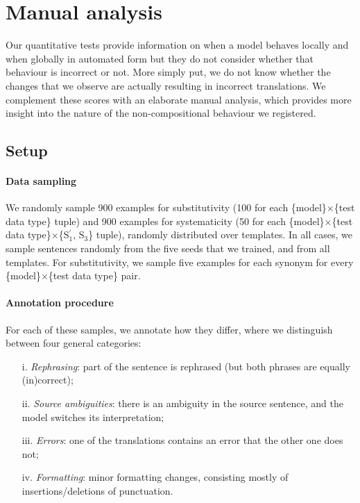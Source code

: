 \onecolumn
\section{Manual analysis}\label{app:man_analysis}

Our quantitative tests provide information on when a model behaves locally and when globally in automated form but they do not consider whether that behaviour is incorrect or not.
More simply put, we do not know whether the changes that we observe are actually resulting in incorrect translations.
We complement these scores with an elaborate manual analysis, which provides more insight into the nature of the non-compositional behaviour we registered.

\subsection{Setup}

\paragraph{Data sampling} We randomly sample 900 examples for substitutivity (100 for each \{model\}$\times$\{test data type\} tuple) and 900 examples for systematicity (50 for each \{model\}$\times$\{test data type\}$\times$\{S$_1^\prime$, S$_3$\} tuple), randomly distributed over templates.
In all cases, we sample sentences randomly from the five seeds that we trained, and from all templates.
For substitutivity, we sample five examples for each synonym for every \{model\}$\times$\{test data type\} pair.

\paragraph{Annotation procedure}
For each of these samples, we annotate how they differ, where we distinguish between four general categories:
\begin{itemize}[noitemsep,topsep=0pt]
\item[i.] \emph{Rephrasing}: part of the sentence is rephrased (but both phrases are equally (in)correct);
\item[ii.] \emph{Source ambiguities}: there is an ambiguity in the source sentence, and the model switches its interpretation; 
\item[iii.] \emph{Errors}: one of the translations contains an error that the other one does not;
\item[iv.] \emph{Formatting}: minor formatting changes, consisting mostly of insertions/deletions of punctuation.
\end{itemize}

